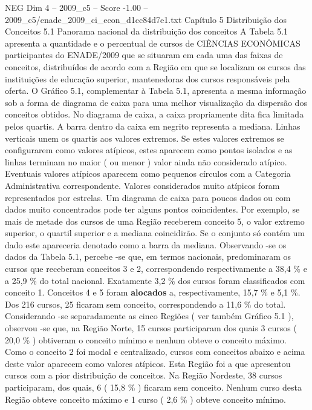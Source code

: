 \begin{textsample}{NEG Dim 4 – 2009\_c5 – Score -1.00 – 2009\_c5/enade\_2009\_ci\_econ\_d1cc84d7e1.txt}  \label{ex:f4_neg_081}
Capítulo 5 Distribuição dos Conceitos 5.1 Panorama nacional da distribuição dos conceitos A Tabela 5.1 apresenta a quantidade e o percentual de cursos de CIÊNCIAS ECONÔMICAS participantes do ENADE/2009 que se situaram em cada uma das faixas de conceitos, distribuídos de acordo com a Região em que se localizam os cursos das instituições de educação superior, mantenedoras dos cursos responsáveis pela oferta.
O Gráfico 5.1, complementar à Tabela 5.1, apresenta a mesma informação sob a forma de diagrama de caixa para uma melhor visualização da dispersão dos conceitos obtidos.
No diagrama de caixa, a caixa propriamente dita fica limitada pelos quartis.
A barra dentro da caixa em negrito representa a mediana.
Linhas verticais unem os quartis aos valores extremos.
Se estes valores extremos se configurarem como valores atípicos, estes aparecem como pontos isolados e as linhas terminam no maior ( ou menor ) valor ainda não considerado atípico.
Eventuais valores atípicos aparecem como pequenos círculos com a Categoria Administrativa correspondente.
Valores considerados muito atípicos foram representados por estrelas.
Um diagrama de caixa para poucos dados ou com dados muito concentrados pode ter alguns pontos coincidentes.
Por exemplo, se mais de metade dos cursos de uma Região receberem conceito 5, o valor extremo superior, o quartil superior e a mediana coincidirão.
Se o conjunto só contém um dado este apareceria denotado como a barra da mediana.
Observando -se os dados da Tabela 5.1, percebe -se que, em termos nacionais, predominaram os cursos que receberam conceitos 3 e 2, correspondendo respectivamente a 38,4 \% e a 25,9 \% do total nacional.
Exatamente 3,2 \% dos cursos foram classificados com conceito 1.
Conceitos 4 e 5 foram \textbf{alocados} a, respectivamente, 15,7 \% e 5,1 \%.
Dos 216 cursos, 25 ficaram sem conceito, correspondendo a 11,6 \% do total.
Considerando -se separadamente as cinco Regiões ( ver também Gráfico 5.1 ), observou -se que, na Região Norte, 15 cursos participaram dos quais 3 cursos ( 20,0 \% ) obtiveram o conceito mínimo e nenhum obteve o conceito máximo.
Como o conceito 2 foi modal e centralizado, cursos com conceitos abaixo e acima deste valor aparecem como valores atípicos.
Esta Região foi a que apresentou cursos com a pior distribuição de conceitos.
Na Região Nordeste, 38 cursos participaram, dos quais, 6 ( 15,8 \% ) ficaram sem conceito.
Nenhum curso desta Região obteve conceito máximo e 1 curso ( 2,6 \% ) obteve conceito mínimo.

\end{textsample}
